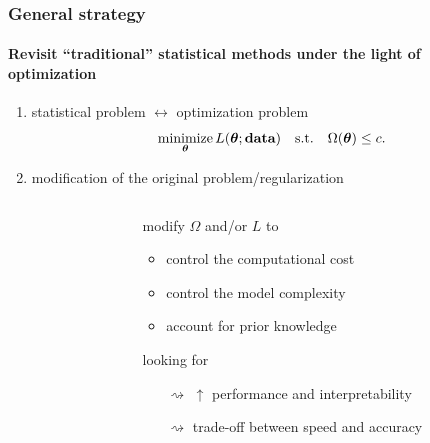 \documentclass[10pt, c, xcolor=x11names]{beamer}\usepackage[]{graphicx}\usepackage[]{color}
\begin{document}
\begin{frame}
  \frametitle{General strategy}
  \framesubtitle{Revisit ``traditional'' statistical methods under the light of optimization}
  
  \begin{overlayarea}{\textwidth}{\textheight}
    
    \begin{enumerate}
      \item statistical problem $\leftrightarrow$ optimization problem
          \begin{equation*}
          \mathop{\mathrm{minimize}}_{\boldsymbol\theta}     L(\boldsymbol\theta;\textbf{data})    \quad
          \text{s.t.} \quad \Omega(\boldsymbol\theta) \leq c.
          \end{equation*}

      \item  modification  of  the original  problem/regularization
          \begin{columns}
            \begin{column}{0.5\textwidth}
            \end{column}
            \begin{column}{0.5\textwidth}
              \begin{footnotesize}
                modify $\Omega$ and/or $L$ to
                \begin{itemize}
                \item \footnotesize control the computational cost
                \item \footnotesize control the model complexity
                \item \footnotesize account for  prior knowledge
                \end{itemize}
                looking for
                \begin{itemize}
                \item[$\rightsquigarrow$] \footnotesize $\uparrow$ performance and interpretability
                \item[$\rightsquigarrow$] \footnotesize trade-off between speed and accuracy
                \end{itemize}
              \end{footnotesize}
            \end{column}
          \end{columns}
      \end{enumerate}
  \end{overlayarea}

\end{frame}
\end{document}
